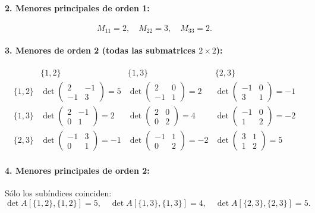 \documentclass{article}
\begin{document}
\paragraph*{2. Menores principales de orden 1:}
\[
M_{11}=2,\quad M_{22}=3,\quad M_{33}=2.
\]

\paragraph*{3. Menores de orden 2 (todas las submatrices \(2\times2\)):}
\[
\begin{array}{c|ccc}
      & \{1,2\}               & \{1,3\}               & \{2,3\}               \\ \hline
\{1,2\}& \det\begin{pmatrix}2&-1\\-1&3\end{pmatrix}=5
       & \det\begin{pmatrix}2&0\\-1&1\end{pmatrix}=2
       & \det\begin{pmatrix}-1&0\\3&1\end{pmatrix}=-1 \\[10pt]
\{1,3\}& \det\begin{pmatrix}2&-1\\0&1\end{pmatrix}=2
       & \det\begin{pmatrix}2&0\\0&2\end{pmatrix}=4
       & \det\begin{pmatrix}-1&0\\1&2\end{pmatrix}=-2 \\[10pt]
\{2,3\}& \det\begin{pmatrix}-1&3\\0&1\end{pmatrix}=-1
       & \det\begin{pmatrix}-1&1\\0&2\end{pmatrix}=-2
       & \det\begin{pmatrix}3&1\\1&2\end{pmatrix}=5
\end{array}
\]

\paragraph*{4. Menores principales de orden 2:}
Sólo los subíndices coinciden:
\[
\det A[\{1,2\},\{1,2\}]=5,\quad
\det A[\{1,3\},\{1,3\}]=4,\quad
\det A[\{2,3\},\{2,3\}]=5.
\]
\end{document}
